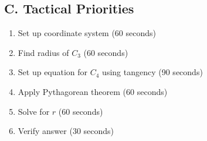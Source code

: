 \documentclass[11pt]{article}
\begin{document}
\begin{tacticalbox}
\subsection*{C. Tactical Priorities}
\begin{enumerate}[leftmargin=*]
    \item Set up coordinate system (60 seconds)
    \item Find radius of $C_3$ (60 seconds)
    \item Set up equation for $C_4$ using tangency (90 seconds)
    \item Apply Pythagorean theorem (60 seconds)
    \item Solve for $r$ (60 seconds)
    \item Verify answer (30 seconds)
\end{enumerate}
\end{tacticalbox}
\end{document}
